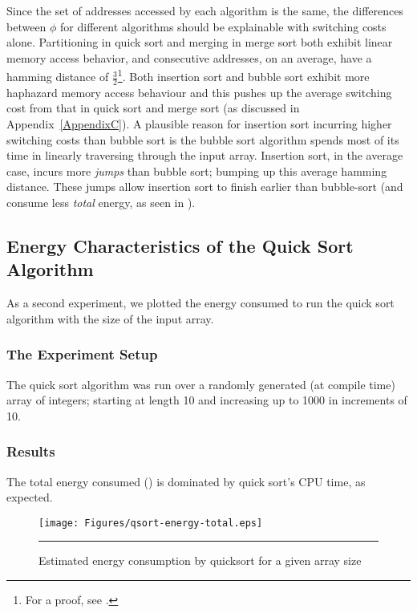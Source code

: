 Since the set of addresses accessed by each algorithm is the same, the
differences between $\phi$ for different algorithms should be
explainable with switching costs alone.  Partitioning in quick sort
and merging in merge sort both exhibit linear memory access behavior,
and consecutive addresses, on an average, have a hamming distance of
$\frac{3}{2}$\footnote{For a proof, see
  .}.  Both insertion sort and bubble
sort exhibit more haphazard memory access behaviour and this pushes up
the average switching cost from that in quick sort and merge sort (as
discussed in Appendix~\ref{AppendixC}).  A plausible reason for
insertion sort incurring higher switching costs than bubble sort is
the bubble sort algorithm spends most of its time in linearly
traversing through the input array.  Insertion sort, in the average
case, incurs more \textit{jumps} than bubble sort; bumping up this
average hamming distance.  These jumps allow insertion sort to finish
earlier than bubble-sort (and consume less \textit{total} energy, as
seen in ).

\subsection{Energy Characteristics of the Quick Sort Algorithm}

As a second experiment, we plotted the energy consumed to run the
quick sort algorithm with the size of the input array.

\subsubsection{The Experiment Setup}

The quick sort algorithm was run over a randomly generated (at compile
time) array of integers; starting at length 10 and increasing up to
1000 in increments of 10.

\subsubsection{Results}

The total energy consumed ()
is dominated by quick sort's CPU time, as expected.

\begin{figure}[hp]
  \centering
  \texttt{[image: Figures/qsort-energy-total.eps]}
  \rule{35em}{0.5pt}
  \caption{Estimated energy consumption by quicksort for a given array size}
  \label{fig:qsort-energy-per-array-length}
\end{figure}

